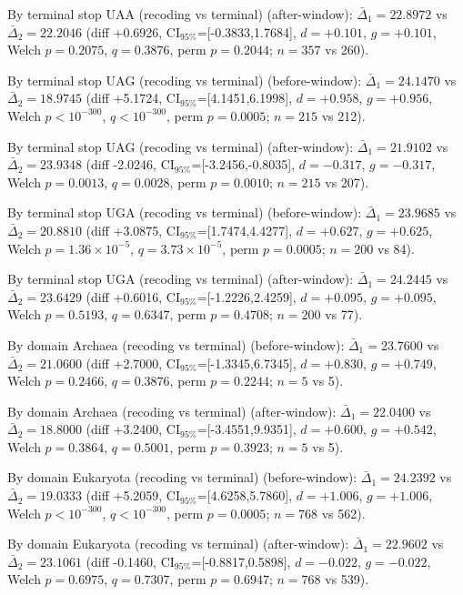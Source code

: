 By terminal stop $\mathrm{UAA}$ (recoding vs terminal) (after-window): $\bar{\Delta}_1=22.8972$ vs $\bar{\Delta}_2=22.2046$ (diff +0.6926, CI$_{95\%}$=[-0.3833,1.7684], $d=+0.101$, $g=+0.101$, Welch $p=0.2075$, $q=0.3876$, perm $p=0.2044$; $n=357$ vs 260).

By terminal stop $\mathrm{UAG}$ (recoding vs terminal) (before-window): $\bar{\Delta}_1=24.1470$ vs $\bar{\Delta}_2=18.9745$ (diff +5.1724, CI$_{95\%}$=[4.1451,6.1998], $d=+0.958$, $g=+0.956$, Welch $p<10^{-300}$, $q<10^{-300}$, perm $p=0.0005$; $n=215$ vs 212).

By terminal stop $\mathrm{UAG}$ (recoding vs terminal) (after-window): $\bar{\Delta}_1=21.9102$ vs $\bar{\Delta}_2=23.9348$ (diff -2.0246, CI$_{95\%}$=[-3.2456,-0.8035], $d=-0.317$, $g=-0.317$, Welch $p=0.0013$, $q=0.0028$, perm $p=0.0010$; $n=215$ vs 207).

By terminal stop $\mathrm{UGA}$ (recoding vs terminal) (before-window): $\bar{\Delta}_1=23.9685$ vs $\bar{\Delta}_2=20.8810$ (diff +3.0875, CI$_{95\%}$=[1.7474,4.4277], $d=+0.627$, $g=+0.625$, Welch $p=1.36\times 10^{-5}$, $q=3.73\times 10^{-5}$, perm $p=0.0005$; $n=200$ vs 84).

By terminal stop $\mathrm{UGA}$ (recoding vs terminal) (after-window): $\bar{\Delta}_1=24.2445$ vs $\bar{\Delta}_2=23.6429$ (diff +0.6016, CI$_{95\%}$=[-1.2226,2.4259], $d=+0.095$, $g=+0.095$, Welch $p=0.5193$, $q=0.6347$, perm $p=0.4708$; $n=200$ vs 77).

By domain Archaea (recoding vs terminal) (before-window): $\bar{\Delta}_1=23.7600$ vs $\bar{\Delta}_2=21.0600$ (diff +2.7000, CI$_{95\%}$=[-1.3345,6.7345], $d=+0.830$, $g=+0.749$, Welch $p=0.2466$, $q=0.3876$, perm $p=0.2244$; $n=5$ vs 5).

By domain Archaea (recoding vs terminal) (after-window): $\bar{\Delta}_1=22.0400$ vs $\bar{\Delta}_2=18.8000$ (diff +3.2400, CI$_{95\%}$=[-3.4551,9.9351], $d=+0.600$, $g=+0.542$, Welch $p=0.3864$, $q=0.5001$, perm $p=0.3923$; $n=5$ vs 5).

By domain Eukaryota (recoding vs terminal) (before-window): $\bar{\Delta}_1=24.2392$ vs $\bar{\Delta}_2=19.0333$ (diff +5.2059, CI$_{95\%}$=[4.6258,5.7860], $d=+1.006$, $g=+1.006$, Welch $p<10^{-300}$, $q<10^{-300}$, perm $p=0.0005$; $n=768$ vs 562).

By domain Eukaryota (recoding vs terminal) (after-window): $\bar{\Delta}_1=22.9602$ vs $\bar{\Delta}_2=23.1061$ (diff -0.1460, CI$_{95\%}$=[-0.8817,0.5898], $d=-0.022$, $g=-0.022$, Welch $p=0.6975$, $q=0.7307$, perm $p=0.6947$; $n=768$ vs 539).
